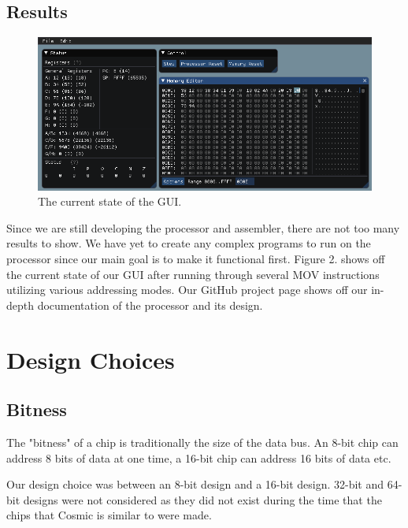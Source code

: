 \documentclass[conference]{IEEEtran}
\begin{document}
\subsection{Results}
\begin{figure}[h!]
	\includegraphics[width=\linewidth]{cosmic_GUI.png}
	\caption{The current state of the GUI.}
	\label{fig:Cosmic GUI}
\end{figure}

Since we are still developing the processor and assembler, there are not too many results to show. We have yet to create any complex programs to run on the processor since our main goal is to make it functional first. Figure 2. shows off the current state of our GUI after running through several MOV instructions utilizing various addressing modes. Our GitHub project page shows off our in-depth documentation of the processor and its design.

\section{Design Choices}
\subsection{Bitness}
The "bitness" of a chip is traditionally the size of the data bus. An 8-bit chip can address 8 bits of data at one time, a 16-bit chip can address 16 bits of data etc.

Our design choice was between an 8-bit design and a 16-bit design. 32-bit and 64-bit designs were not considered as they did not exist during the time that the chips that Cosmic is similar to were made.\\

\\
\end{document}

